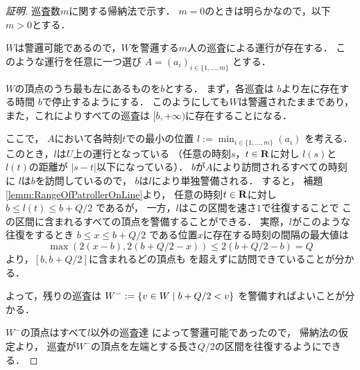 \begin{proof}[証明]

    \newcommand{\leftmostpoint}{b}  %
    \newcommand{\newpatroller}{l}


    巡査数$m$に関する帰納法で示す．
    $m = 0$のときは明らかなので，以下$m > 0$とする．

    $W$は警邏可能であるので，$W$を警邏する$m$人の巡査による運行が存在する．
    このような運行を任意に一つ選び
    $A = (a _i) _{i \in \{1, \ldots, m\}}$
    とする．

    $W$の頂点のうち最も左にあるものを$\leftmostpoint$とする．
    まず，各巡査は
    $\leftmostpoint$より左に存在する時間
    $\leftmostpoint$で停止するようにする．
    このようにしても$W$は警邏されたままであり，
    また，これによりすべての巡査は
    $[\leftmostpoint, +\infty)$に存在することになる．

    ここで，
    $A$において各時刻$t$での最小の位置
    $\newpatroller := \min _{i \in \{1, \ldots, m\}} (a _i)$
    を考える．
    このとき，$\newpatroller$は$U$上の運行となっている
    （任意の時刻$s$，$t \in \mathbf R$に対し
    $\newpatroller (s)$と
    $\newpatroller (t)$の距離が
    $\lvert s - t \rvert$以下になっている）．
    $\leftmostpoint$が$A$により訪問されるすべての時刻に
    $\newpatroller$は$\leftmostpoint$を訪問しているので，
    $\leftmostpoint$は$\newpatroller$により単独警備される．
    すると，
    補題\ref{lemm:RangeOfPatrollerOnLine}より，
    任意の時刻$t \in \mathbf R$に対し
    $\leftmostpoint \leq \newpatroller(t) \leq \leftmostpoint + Q/2$
    であるが，
    一方，$\newpatroller$はこの区間を速さ$1$で往復することで
    この区間に含まれるすべての頂点を警備することができる．
    実際，$\newpatroller$がこのような往復をするとき
    $\leftmostpoint \leq x \leq \leftmostpoint + Q/2$
    である位置$x$に存在する時刻の間隔の最大値は
    \[
        \max( 2(x - \leftmostpoint), 2(\leftmostpoint + Q/2 - x) )
        \leq 2(\leftmostpoint + Q/2 - \leftmostpoint) = Q
    \]
    より，$[\leftmostpoint, \leftmostpoint + Q/2]$に含まれるどの頂点も
    {\timelimit}を超えずに訪問できていることが分かる．

    
    よって，残りの巡査は
    $W ^- := \setmid{ v \in W }{ \leftmostpoint + Q/2 < v }$
    を警備すればよいことが分かる．

    $W ^-$の頂点はすべて$\newpatroller$以外の巡査達
    によって警邏可能であったので，
    帰納法の仮定より，
    巡査が$W ^-$の頂点を左端とする長さ$Q / 2$の区間を往復するようにできる．
\end{proof}

